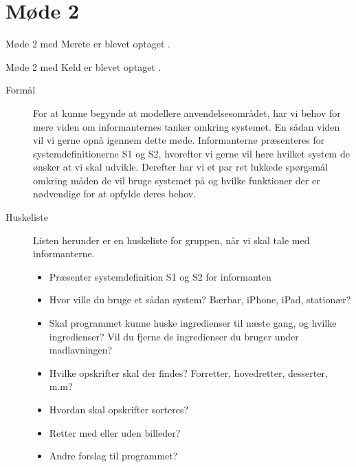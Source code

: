 \section{Møde 2}

Møde 2 med Merete er blevet optaget \cite{moede2merete}.

Møde 2 med Keld er blevet optaget \cite{moede2keld}.

\begin{description}

\item[Formål]
For at kunne begynde at modellere anvendelsesområdet, har vi behov for mere viden om informanternes tanker omkring systemet. En sådan viden vil vi gerne opnå igennem dette møde. Informanterne præsenteres for systemdefinitionerne S1 og S2, hvorefter vi gerne vil høre hvilket system de ønsker at vi skal udvikle. Derefter har vi et par ret lukkede spørgsmål omkring måden de vil bruge systemet på og hvilke funktioner der er nødvendige for at opfylde deres behov.

\item[Huskeliste] Listen herunder er en huskeliste for gruppen, når vi skal tale med informanterne.

\begin{itemize}[noitemsep]
\item Præsenter systemdefinition S1 og S2 for informanten
\item Hvor ville du bruge et sådan system? Bærbar, iPhone, iPad, stationær?
\item Skal programmet kunne huske ingredienser til næste gang, og hvilke ingredienser? Vil du fjerne de ingredienser du bruger under madlavningen?
\item Hvilke opskrifter skal der findes? Forretter, hovedretter, desserter, m.m?
\item Hvordan skal opskrifter sorteres?
\item Retter med eller uden billeder?
\item Andre forslag til programmet?
\end{itemize}


\end{description}
